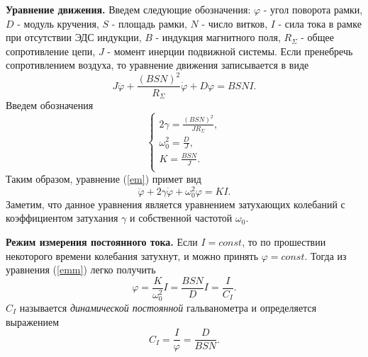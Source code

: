 \documentclass[12pt,a4paper]{article}
\begin{document}
\textbf{Уравнение движения.} Введем следующие обозначения: $\varphi$ - угол поворота рамки, $D$ - модуль кручения, $S$ - площадь рамки, $N$ - число витков, $I$ - сила тока в рамке при отсутствии ЭДС индукции, $B$ - индукция магнитного поля, $R_{\Sigma}$ - общее сопротивление цепи, $J$ - момент инерции подвижной системы. Если пренебречь сопротивлением воздуха, то уравнение движения записывается в виде
\begin{equation}
J\ddot\varphi + \frac{(BSN)^2}{R_{\Sigma}}\dot\varphi + D\varphi = BSNI\label{em}.
\end{equation}
Введем обозначения
\begin{equation}
\begin{cases}
2\gamma = \frac{(BSN)^2}{JR_{\Sigma}},\\
\omega_0^2 = \frac{D}{J},\\
K = \frac{BSN}{J}.\\ 
\end{cases}\label{redef}
\end{equation}
Таким образом, уравнение (\ref{em}) примет вид
\begin{equation}
\ddot\varphi + 2\gamma\dot\varphi + \omega_0^2\varphi = KI\label{emm}.
\end{equation}
Заметим, что данное уравнения является уравнением затухающих колебаний с коэффициентом затухания $\gamma$ и собственной частотой $\omega_0$.
\medskip

\textbf{Режим измерения постоянного тока.} Если $I = const$, то по прошествии некоторого времени колебания затухнут, и можно принять $\varphi = const$. Тогда из уравнения (\ref{emm}) легко получить
\begin{equation}
\varphi = \frac{K}{\omega_0^2}I = \frac{BSN}{D}I = \frac{I}{C_I}.
\end{equation}
$C_I$ называется \textit{динамической постоянной} гальванометра и определяется выражением
\begin{equation}
C_I = \frac{I}{\varphi} = \frac{D}{BSN}.\label{dyn}
\end{equation}
\medskip
\end{document}
